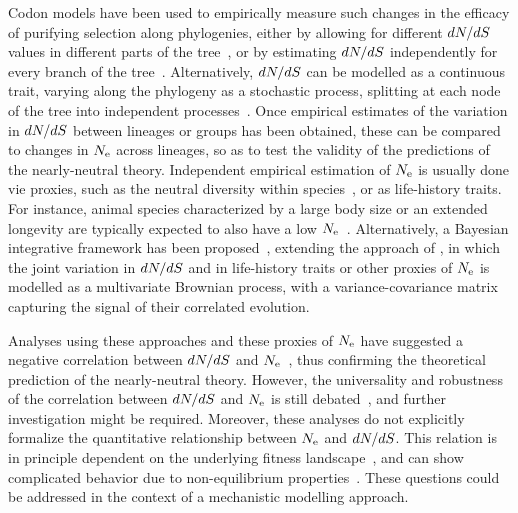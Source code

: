 \documentclass{MBE}
\begin{document}
	Codon models have been used to empirically measure such changes in the efficacy of purifying selection along phylogenies, either by allowing for different $dN/dS$ values in different parts of the tree~\citep{Dutheil2012}, or by estimating $dN/dS$ independently for every branch of the tree~\citep{Popadin2007}.
	Alternatively, $dN/dS$ can be modelled as a continuous trait, varying along the phylogeny as a stochastic process, splitting at each node of the tree into independent processes~\citep{Seo2004}.
	Once empirical estimates of the variation in $dN/dS$ between lineages or groups has been obtained, these can be compared to changes in $N_{\text{e}}$ across lineages, so as to test the validity of the predictions of the {nearly-neutral} theory.
	Independent empirical estimation of $N_{\text{e}}$ is usually done vie proxies, such as the {neutral} diversity within species~\citep{Galtier2016}, or as life-history traits.
	For instance, animal species characterized by a large body size or an extended longevity are typically expected to also have a low $N_{\text{e}}$~\citep{Romiguier2014}.
	Alternatively, a Bayesian integrative framework has been proposed~\citep{Lartillot2011}, extending the approach of \citet{Seo2004}, in which the joint variation in $dN/dS$ and in life-history traits or other proxies of $N_{\text{e}}$ is modelled as a multivariate Brownian process, with a variance-covariance matrix capturing the signal of their correlated evolution.

	Analyses using these approaches and these proxies of $N_{\text{e}}$ have suggested a negative correlation between $dN/dS$ and $N_{\text{e}}$~\citep{Popadin2007, Lanfear2010, Lartillot2011, Lartillot2012, Romiguier2014, Figuet2017}, thus confirming the theoretical prediction of the {nearly-neutral} theory.
	However, the universality and robustness of the correlation between $dN/dS$ and $N_{\text{e}}$ is still debated~\citep{Nabholz2013,Lanfear2014,Figuet2016, Bolivar2019}, and further investigation might be required.
	Moreover, these analyses do not explicitly formalize the quantitative relationship between $N_{\text{e}}$ and $dN/dS$.
	This relation is in principle dependent on the underlying fitness landscape~\citep{Welch2008}, and can show complicated behavior due to non-equilibrium properties~\citep{Jones2016}.
	These questions could be addressed in the context of a mechanistic modelling approach.
\end{document}
